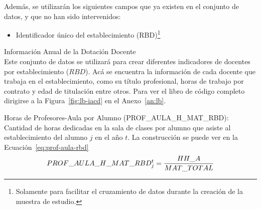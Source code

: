 \begin{longdescription}
\begin{longdescription}
                Además, se utilizarán los siguientes campos que ya existen en el conjunto de datos, y que no han sido intervenidos:
                \begin{itemize}
                  \item Identificador único del establecimiento (RBD)\footnote{Solamente para facilitar el cruzamiento de datos durante la creación de la muestra de estudio.}
                \end{itemize}
        \end{longdescription}
        \item[Información Anual de la Dotación Docente] \hfill \\
        Este conjunto de datos se utilizará para crear diferentes indicadores de docentes por establecimiento ($RBD$).
        Acá se encuentra la información de cada docente que trabaja en el establecimiento, como su título profesional, horas de trabajo por contrato y edad de titulación entre otros. Para ver el libro de código completo dirigirse a la Figura~\ref{fig:lb-iacd} en el Anexo~\ref{an:lb}.
            \begin{longdescription}
                \item[Horas de Profesores-Aula por Alumno](PROF\_AULA\_H\_MAT\_RBD): Cantidad de horas dedicadas en la sala de clases por alumno que asiste al establecimiento del alumno $j$ en el año $t$.
                La construcción se puede ver en la Ecuación~\ref{eq:prof-aula-rbd}
                  \begin{equation}
                  \centering
                    PROF\_AULA\_H\_MAT\_RBD_{j}^{t} = \frac{HH\_A}{MAT\_TOTAL}
                    \label{eq:prof-aula-rbd}
                  \end{equation}
                

\end{longdescription}
\end{longdescription}
